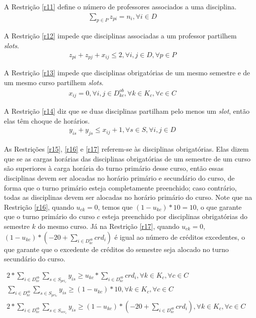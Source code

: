 A Restrição \ref{r11} define o número de professores associados a uma disciplina.
\begin{eqnarray}
\label{r11}
\sum_{p\in{P}}^{}{z_{pi}} = n_i, \forall{i}\in{D} &&
\end{eqnarray}

A Restrição \ref{r12} impede que disciplinas associadas a um professor partilhem \textit{slots}.
\begin{eqnarray}
\label{r12}
z_{pi} + z_{pj} + x_{ij} \leq 2, \forall{i,j}\in{D}, \forall{p}\in{P} &&
\end{eqnarray}

A Restrição \ref{r13} impede que disciplinas obrigatórias de um mesmo semestre e de um mesmo curso partilhem \textit{slots}.
\begin{eqnarray}
\label{r13}
x_{ij} = 0, \forall{i,j}\in{D_{kc}^{ob}}, \forall{k}\in{K_c}, \forall{c}\in{C} &&
\end{eqnarray}

A Restrição \ref{r14} diz que se duas disciplinas partilham pelo menos um \textit{slot}, então elas têm choque de horários.
\begin{eqnarray}
\label{r14}
y_{is} + y_{js} \leq x_{ij} + 1, \forall{s}\in{S}, \forall{i, j}\in{D} &&
\end{eqnarray}

As Restrições \ref{r15}, \ref{r16} e \ref{r17} referem-se às disciplinas obrigatórias. Elas dizem que se as cargas horárias das disciplinas obrigatórias de um semestre de um curso são superiores à carga horária do turno primário desse curso, então essas disciplinas devem ser alocadas no horário primário e secundário do curso, de forma que o turno primário esteja completamente preenchido; caso contrário, todas as disciplinas devem ser alocadas no horário primário do curso. Note que na Restrição \ref{r16}, quando $u_{ck} = 0$, temos que $(1 - u_{kc}) * 10 = 10$, o que garante que o turno primário do curso $c$ esteja preenchido por disciplinas obrigatórias do semestre $k$ do mesmo curso. Já na Restrição \ref{r17}, quando $u_{ck} = 0$, $(1 - u_{kc}) * (-20+\sum_{i \in{D_{kc}^{ob}}}^{}{crd_i})$ é igual ao número de créditos excedentes, o que garante que o excedente de créditos do semestre seja alocado no turno secundário do curso.
 
\begin{eqnarray}
\label{r15}
2*\sum_{i \in{D_{kc}^{ob}}}^{}{\sum_{s\in{S_{pri_c}}}^{}{y_{is}}}\geq u_{kc} * \sum_{i \in{D_{kc}^{ob}}}^{}{crd_i}, \forall{k}\in{K_c}, \forall{c}\in{C}  &&\\
\label{r16}
\sum_{i \in{D_{kc}^{ob}}}^{}{\sum_{s \in{S_{pri_c}}}^{}{y_{is}}} \geq (1 - u_{kc}) * 10, \forall{k}\in{K_c}, \forall{c}\in{C}  &&\\
\label{r17}
2*\sum_{i \in{D_{kc}^{ob}}}^{}{\sum_{s \in{S_{sec_c}}}^{}{y_{is}}}\geq (1 - u_{kc}) * (-20+\sum_{i \in{D_{kc}^{ob}}}^{}{crd_i}),\forall{k}\in{K_c}, \forall{c}\in{C}&&
\end{eqnarray}

